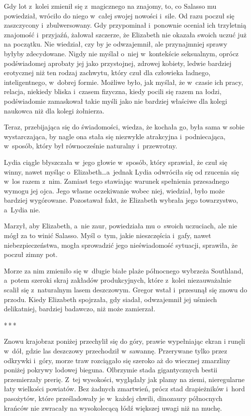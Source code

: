 \documentclass[oneside,polish,12pt,sfheadings]{mwbk}
\newcommand{\threeast}{\bigskip\par\centerline{*\,*\,*}\medskip\par}%
\begin{document}
Gdy lot z~kolei zmienił się z~magicznego na znajomy, to, co Salasso mu
powiedział, wróciło do niego w~całej swojej nowości i~sile. Od razu
poczuł się zaszczycony i~zbulwersowany. Gdy przypominał i~ponownie
oceniał ich trzyletnią znajomość i~przyjaźń, żałował szczerze, że
Elizabeth nie okazała swoich uczuć już na początku. Nie wiedział, czy by
je odwzajemnił, ale przynajmniej sprawy byłyby zdecydowane. Nigdy nie
myślał o~niej w~kontekście seksualnym, oprócz podświadomej aprobaty jej
jako przystojnej, zdrowej kobiety, ledwie bardziej erotycznej niż ten
rodzaj zachwytu, który czuł dla człowieka ładnego, inteligentnego, w~dobrej formie. Możliwe było, jak myślał, że w~czasie ich pracy, relacja,
niekiedy bliska i~czasem fizyczna, kiedy pocili się razem na łodzi,
podświadomie zamaskował takie myśli jako nie bardziej właściwe dla
kolegi naukowca niż dla kolegi żołnierza.

Teraz, przebijająca się do świadomości, wiedza, że kochała go, była sama
w sobie wystarczająca, by nagle ona stała się niezwykle atrakcyjna i~podniecająca, w~sposób, który był równocześnie naturalny i~przewrotny.

Lydia ciągle błyszczała w~jego głowie w~sposób, który sprawiał, że czuł
się winny, nawet myśląc o~Elizabeth\ldots a~jednak Lydia odwróciła się od
rzucenia się w~los razem z~nim. Zamiast tego stawiając warunek
spełnienia przesadnego wymogu jej ojca. Jego własne oczekiwanie wobec
niej, wiedział, było może bardziej wygórowane. Pozostawał fakt, że
Elizabeth wybrała jego towarzystwo, a~Lydia nie.

Marzył, aby Elizabeth, a~nie zaur, powiedziała mu o~swoich uczuciach,
ale nie mógł za to winić Salasso. Myśl o~tym, jakie nieszczęścia i~gafy,
nawet niebezpieczeństwa, mogła sprowadzić jego nieświadomość sytuacji,
sprawiła, że poczuł zimny pot.

Morze za nim zmieniło się w~długie białe plaże północnego wybrzeża
Southland, a~potem szeroki skraj zakładów produkcyjnych, które z~kolei
niezauważalnie scalił się z~naturalnym lasem deszczowym. Gregor wstał i~przesunął się znowu do przodu. Kiedy Elizabeth spojrzała, gdy siadał,
odwzajemnił jej uśmiech delikatniej, bardziej badawczo, niż może
zamierzał.

\threeast

Znowu krajobraz poniżej przechylił się do góry, prawie wypełniając ekran
i runęli w~dół, gdzie las deszczowy przechodził w~sawannę. Przerywane
tylko przez odkrywki i~góry, morze traw rozciągało się szeroko aż do
wiecznej zmarzliny poniżej pokrywy lodowej bieguna. Olbrzymie stada
gigantycznych bestii przemierzały prerię. Z~tej wysokości, wyglądały jak
plamy na ziemi, nieregularne łaty wielkości powiatów. Bez żadnych
zmartwień, prócz stad drapieżników i~hord pasożytów, które prześladowały
je w~każdej chwili, dinozaury północnych krańców nie zwracały na
wysokolecącą łódź większej uwagi niż na muchę.
\end{document}
